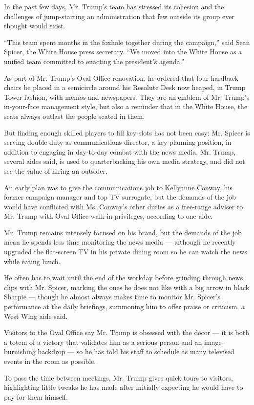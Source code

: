 In the past few days, Mr. Trump's team has stressed its cohesion and the
challenges of jump-starting an administration that few outside its group
ever thought would exist.

``This team spent months in the foxhole together during the campaign,''
said Sean Spicer, the White House press secretary. ``We moved into the
White House as a unified team committed to enacting the president's
agenda.''

As part of Mr. Trump's Oval Office renovation, he ordered that four
hardback chairs be placed in a semicircle around his Resolute Desk now
heaped, in Trump Tower fashion, with memos and newspapers. They are an
emblem of Mr. Trump's in-your-face management style, but also a reminder
that in the White House, the seats always outlast the people seated in
them.

But finding enough skilled players to fill key slots has not been easy:
Mr. Spicer is serving double duty as communications director, a key
planning position, in addition to engaging in day-to-day combat with the
news media. Mr. Trump, several aides said, is used to quarterbacking his
own media strategy, and did not see the value of hiring an outsider.

An early plan was to give the communications job to Kellyanne Conway,
his former campaign manager and top TV surrogate, but the demands of the
job would have conflicted with Ms. Conway's other duties as a free-range
adviser to Mr. Trump with Oval Office walk-in privileges, according to
one aide.

Mr. Trump remains intensely focused on his brand, but the demands of the
job mean he spends less time monitoring the news media --- although he
recently upgraded the flat-screen TV in his private dining room so he
can watch the news while eating lunch.

He often has to wait until the end of the workday before grinding
through news clips with Mr. Spicer, marking the ones he does not like
with a big arrow in black Sharpie --- though he almost always makes time
to monitor Mr. Spicer's performance at the daily briefings, summoning
him to offer praise or criticism, a West Wing aide said.

Visitors to the Oval Office say Mr. Trump is obsessed with the décor ---
it is both a totem of a victory that validates him as a serious person
and an image-burnishing backdrop --- so he has told his staff to
schedule as many televised events in the room as possible.

To pass the time between meetings, Mr. Trump gives quick tours to
visitors, highlighting little tweaks he has made after initially
expecting he would have to pay for them himself.

